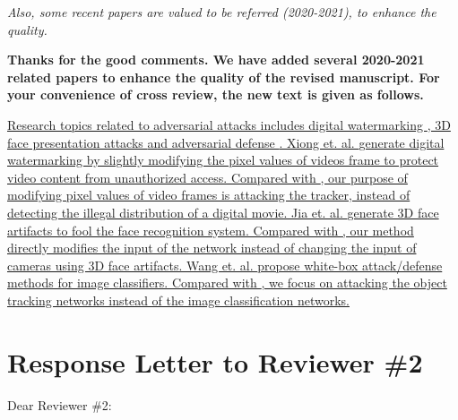 \documentclass[12pt]{article}
\begin{document}
\restoregeometry

\textit{Also, some recent papers are valued to be referred (2020-2021), to enhance the quality.}

\textbf{Thanks for the good comments. We have added several 2020-2021 related papers to enhance the quality of the revised manuscript. For your convenience of cross review, the new text is given as follows.}

\uline{Research topics related to adversarial attacks includes digital watermarking \cite{9343885}, 3D face presentation attacks \cite{9303455} and adversarial defense \cite{9169672}.
Xiong et. al. \cite{9343885} generate digital watermarking by slightly modifying the pixel values of videos frame to protect video content from unauthorized access. Compared with \cite{9343885}, our purpose of modifying pixel values of video frames is attacking the tracker, instead of detecting the illegal distribution of a digital movie.
Jia et. al. \cite{9294085} generate 3D face artifacts to fool the face recognition system. Compared with \cite{9294085}, our method directly modifies the input of the network instead of changing the input of cameras using 3D face artifacts.
Wang et. al. \cite{9169672} propose white-box attack/defense methods for image classifiers. Compared with \cite{9169672}, we focus on attacking the object tracking networks instead of the image classification networks.}

\newpage
{\centering\section*{Response Letter to Reviewer \#2}}
\noindent Dear Reviewer \#2:
\end{document}
